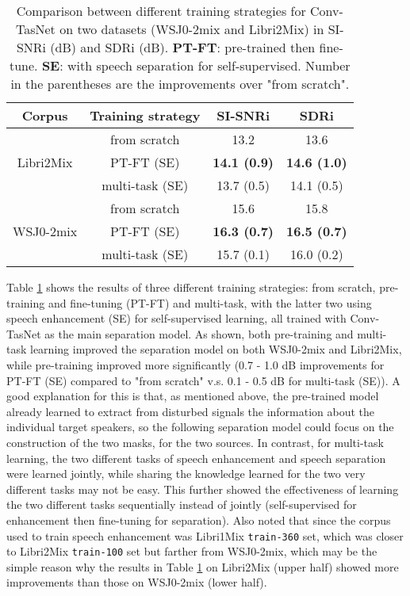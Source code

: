 \documentclass[a4paper]{article}
\begin{document}
\begin{table}[t]
    \centering
    \caption{
        Comparison between different training strategies for Conv-TasNet on two datasets (WSJ0-2mix and Libri2Mix) in SI-SNRi (dB) and SDRi (dB).
        \textsc{\bf PT-FT}: pre-trained then fine-tune.
        \textsc{\bf SE}: with speech separation for self-supervised.
        Number in the parentheses are the improvements over "from scratch".
    }
    \label{table:result}
    \begin{tabular}{c|c|c|c} 
        \toprule
        Corpus & Training strategy & SI-SNRi & SDRi \\
        \midrule
        \multirow{3}{5em}{\centering Libri2Mix} & from scratch & 13.2 & 13.6 \\ 
        & PT-FT (SE) & \textbf{14.1 (0.9)} & \textbf{14.6 (1.0)} \\
        & multi-task (SE) & 13.7 (0.5) & 14.1 (0.5) \\
        \midrule
        \multirow{3}{5em}{\centering WSJ0-2mix} & from scratch & 15.6 & 15.8 \\ 
        & PT-FT (SE)  & \textbf{16.3 (0.7)} & \textbf{16.5 (0.7)} \\
        & multi-task (SE) & 15.7 (0.1) & 16.0 (0.2) \\
        \bottomrule
    \end{tabular}
\vspace{-0.3cm}
\end{table}

Table \ref{table:result} shows the results of three different training strategies: from scratch, pre-training and fine-tuning (PT-FT) and multi-task, with the latter two using speech enhancement (SE) for self-supervised learning, all trained with Conv-TasNet as the main separation model.
As shown, both pre-training and multi-task learning improved the separation model on both WSJ0-2mix and Libri2Mix, while pre-training improved more significantly (0.7 - 1.0 dB improvements for PT-FT (SE) compared to "from scratch" v.s. 0.1 - 0.5 dB for multi-task (SE)).
A good explanation for this is that, as mentioned above, the pre-trained model already learned to extract from disturbed signals the information about the individual target speakers, so the following separation model could focus on the construction of the two masks, for the two sources.
In contrast, for multi-task learning, the two different tasks of speech enhancement and speech separation were learned jointly, while sharing the knowledge learned for the two very different tasks may not be easy.
This further showed the effectiveness of learning the two different tasks sequentially instead of jointly (self-supervised for enhancement then fine-tuning for separation).
Also noted that since the corpus used to train speech enhancement was Libri1Mix \texttt{train-360} set, which was closer to Libri2Mix \texttt{train-100} set but farther from WSJ0-2mix, which may be the simple reason why the results in Table \ref{table:result} on Libri2Mix (upper half) showed more improvements than those on WSJ0-2mix (lower half).
\end{document}
